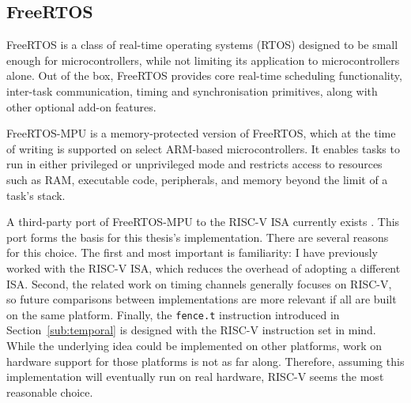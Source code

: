 \subsection{FreeRTOS}\label{sub:FreeRTOS} %
FreeRTOS is a class of real-time operating systems (RTOS) designed to be small
enough for microcontrollers, while not limiting its application to microcontrollers
alone. Out of the box, FreeRTOS provides core real-time scheduling functionality,
inter-task communication, timing and synchronisation primitives, along with
other optional add-on features. \cite{WhatFreeRTOSFreeRTOS2026}

FreeRTOS-MPU is a memory-protected version of FreeRTOS, which at the time of
writing is supported on select ARM-based microcontrollers. It enables tasks to
run in either privileged or unprivileged mode and restricts access to resources
such as RAM, executable code, peripherals, and memory beyond the limit of a
task's stack. \cite{MemoryProtectionUnit2026}

A third-party port of FreeRTOS-MPU to the RISC-V ISA currently exists
\cite{FreeRTOSCommunitySupportedDemosRISCV_RV32_MPU_QEMU_VIRT_GCCmain}. This
port forms the basis for this thesis's implementation. There are several reasons
for this choice. The first and most important is familiarity: I have previously
worked with the RISC-V ISA, which reduces the overhead of adopting a different
ISA. Second, the related work on timing channels generally focuses on RISC-V, so
future comparisons between implementations are more relevant if all are built on
the same platform. Finally, the \texttt{fence.t} instruction introduced in
Section~\ref{sub:temporal} is designed with the RISC-V instruction set in mind.
While the underlying idea could be implemented on other platforms, work on
hardware support for those platforms is not as far along. Therefore, assuming
this implementation will eventually run on real hardware, RISC-V seems the most
reasonable choice.

